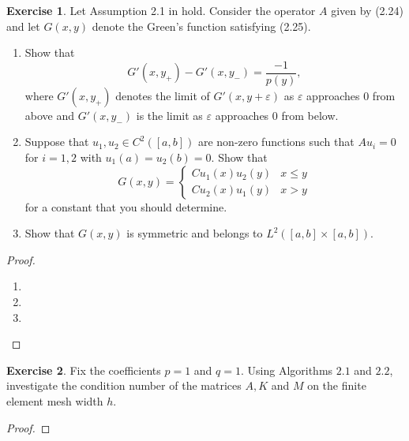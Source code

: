\documentclass{amsart}
\theoremstyle{plain}
\theoremstyle{definition}
\newtheorem{exer}{Exercise}[section]
\begin{document}
\begin{exer}
    Let Assumption 2.1 in \cite{lord2014introduction} hold. Consider the operator $A$ given by (2.24) and let $G(x,y)$ denote the Green's function satisfying (2.25).
    \begin{enumerate}[label=\alph*.]
        \item Show that 
        $$G'(x,y_{+}) - G'(x,y_{-}) = \frac{-1}{p(y)},$$
        where $G'(x,y_{+})$ denotes the limit of $G'(x,y+\varepsilon)$ as $\varepsilon$ approaches $0$ from above and $G'(x,y_{-})$ is the limit as $\varepsilon$ approaches $0$ from below. 
        \item Suppose that $u_1,u_2 \in C^{2}([a,b])$ are non-zero functions such that $Au_i = 0$ for $i=1,2$ with $u_1(a)=u_2(b) = 0.$ Show that 
        $$G(x,y) = \begin{cases}
            Cu_1(x)u_2(y) & x\leq y\\
            Cu_2(x)u_1(y) & x>y
    \end{cases}$$
    for a constant that you should determine.
    \item Show that $G(x,y)$ is symmetric and belongs to $L^2\left([a,b]\times[a,b]\right).$
    \end{enumerate}
\end{exer}
\begin{proof}
    \begin{enumerate}[label=\alph*.]
        \item 
        \item
        \item 
    \end{enumerate}
\end{proof}

\begin{exer}
    Fix the coefficients $p=1$ and $q=1.$ Using Algorithms $2.1$ and $2.2$, investigate the condition number of the matrices $A,K$ and $M$ on the finite element mesh width $h$.
\end{exer}
\begin{proof}
    
\end{proof}
\end{document}
